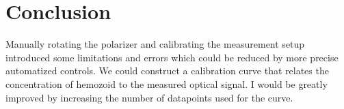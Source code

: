 \documentclass[12pt,a4paper]{article}
\begin{document}
\section{Conclusion}

Manually rotating the polarizer and calibrating the measurement setup introduced some limitations and errors which could be reduced by more precise automatized controls.
We could construct a calibration curve that relates the concentration of hemozoid to the measured optical signal. I would be greatly improved by increasing the number of datapoints used for the curve.
\end{document}
